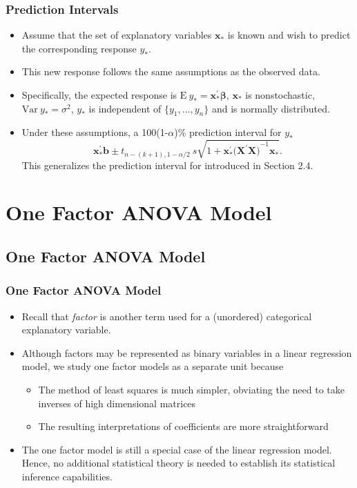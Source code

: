 \begin{frame}%
 \frametitle{Prediction Intervals}
   \begin{itemize}
\item Assume that the set of explanatory variables $\mathbf{x}_{\ast}$
 is known and wish to predict the corresponding response $ y_{\ast}$.
 \item This new response follows the same assumptions as the observed data.
 \item Specifically, the expected response is $\mathrm{E~}y_{\ast}=
\mathbf{x}_{\ast}^{\prime} \boldsymbol \beta$, $\mathbf{x}_{\ast}$
is nonstochastic, $\mathrm{Var~}y_{\ast} = \sigma^2$, $y_{\ast}$ is
independent of $\{y_1,...,y_n\}$ and is normally distributed.
 \item Under these assumptions, a 100(1-$\alpha $)\%
prediction interval for $y_{\ast}$
\begin{equation*}
\mathbf{x}_{\ast}^{\prime} \mathbf{b} \pm t_{n-(k+1),1-\alpha /2} ~s
\sqrt{1 + \mathbf{x}_{\ast}^{\prime}(\mathbf{X^{\prime}X)}^{-1}
\mathbf{x}_{\ast}}.
\end{equation*}
This generalizes the prediction interval for introduced in Section
2.4.
\end{itemize}
\end{frame}

\section{One Factor ANOVA Model}

\subsection{One Factor ANOVA Model}

\begin{frame}%
 \frametitle{One Factor ANOVA Model}
   \begin{itemize}
    \item Recall that \emph{factor} is another term used for a (unordered)
categorical explanatory variable.
 \item Although factors may be represented as binary variables in a
 linear regression model, we study one factor models as a separate
 unit because
    \begin{itemize}
    \item The method of least squares is much simpler, obviating the
    need to take inverses of high dimensional matrices
    \item The resulting interpretations of coefficients are more
    straightforward
         \end{itemize}
    \item The one factor model is still a special case of the linear
    regression model. Hence, no additional statistical theory is needed
    to establish its statistical inference capabilities.
     \end{itemize}
\end{frame}

